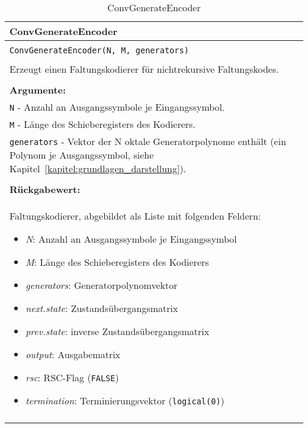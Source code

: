 \begin{longtable}{|p{\textwidth}|}
\hline
\rowcolor{lightblue}
ConvGenerateEncoder
\\
\hline
\\
\texttt{ConvGenerateEncoder(N, M, generators)}\\
\\
Erzeugt einen Faltungskodierer für nichtrekursive Faltungskodes.\\
\\
\textbf{Argumente:}\\
\texttt{N} - Anzahl an Ausgangssymbole je Eingangssymbol.\\
\texttt{M} - Länge des Schieberegisters des Kodierers.\\
\texttt{generators} - Vektor der N oktale Generatorpolynome enthält (ein Polynom je Ausgangssymbol, siehe Kapitel~\ref{kapitel:grundlagen_darstellung}).\\
\\
\textbf{Rückgabewert:}\\
Faltungskodierer, abgebildet als Liste mit folgenden Feldern:
\vspace{-4mm}
\begin{itemize}
\renewcommand\labelitemi{--}
\itemsep-.5em %
\item \emph{N}: Anzahl an Ausgangssymbole je Eingangssymbol
\item \emph{M}: Länge des Schieberegisters des Kodierers
\item \emph{generators}: Generatorpolynomvektor
\item \emph{next.state}: Zustandsübergangsmatrix
\item \emph{prev.state}: inverse Zustandsübergangsmatrix
\item \emph{output}: Ausgabematrix
\item \emph{rsc}: RSC-Flag (\texttt{FALSE})
\item \emph{termination}: Terminierungsvektor (\texttt{logical(0)})
\end{itemize}
\\
\hline
\caption{ConvGenerateEncoder}
\end{longtable}